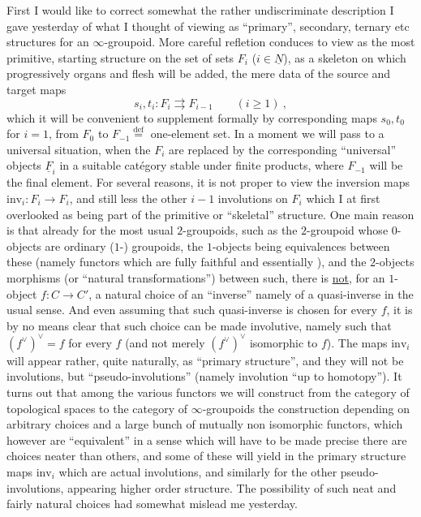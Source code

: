 \quad First I would like to correct somewhat the rather undiscriminate description I gave yesterday of what I thought of viewing as ``primary'', secondary, ternary etc structures for an $\infty$-groupoid. More careful refletion conduces to view as the most primitive, starting structure on the set of sets $F_i$ ($i\in\underline{N}$), as a skeleton on which progressively organs and flesh will be added, the mere data of the source and target maps
\[
s_i,t_i:F_i\rightrightarrows F_{i-1}\qquad(i\geq1)\ ,
\]
which it will be convenient to supplement  formally by corresponding maps $s_0,t_0$ for $i=1$, from $F_0$ to $F_{-1}\mathrel{\overset{\mathrm{def}}{=}}$ one-element set. In a moment we will pass to a universal situation, when the $F_i$ are replaced by the corresponding ``universal'' objects $\underline{F}_i$ in a suitable catégory stable under finite products, where $F_{-1}$ will be the final element. For several reasons, it is not proper to view the inversion maps $\mathrm{inv}_i:F_i\to F_i$, and still less the other $i-1$ involutions on $F_i$ which I at first overlooked\handwritten{,} as being part of the primitive or ``skeletal'' structure. One main reason is that already for the most usual $2$-groupoids, such as the $2$-groupoid whose $0$-objects are ordinary ($1$-) groupoids, the $1$-objects being equivalences between these (namely functors which are fully faithful and essentially ), and the $2$-objects morphisms (or ``natural transformations'') between such, there is \uline{not}, for an $1$-object $f:C\to C'$, a natural choice of an ``inverse'' namely of a quasi-inverse in the usual sense. And even assuming that such quasi-inverse is chosen for every $f$, it is by no means clear that such choice can be made involutive, namely such that $(f^{\vee})^{\vee}=f$ for every $f$ (and not merely $(f^{\vee})^{\vee}$ isomorphic to $f$). The maps $\mathrm{inv}_i$ will appear rather, quite naturally, as ``primary structure'', and they will not be involutions, but ``pseudo-involutions'' (namely involution ``up to homotopy''). It turns out that among the various functors \inserted{\handwritten{$\Pi_\infty$}} we will construct\handwritten{,} from the category of topological spaces to the category of $\infty$-groupoids\deleted{\unsure{,}} \handwritten{(}the construction depending on arbitrary choices and  a large bunch of mutually non isomorphic functors, which however are ``equivalent'' in a sense which will have to be made precise\unsure{\ldots}\deleted{-}\handwritten{)} there are choices neater than others, and some of these will yield in the primary structure maps $\mathrm{inv}_i$ which are actual involutions, and similarly for the other pseudo-involutions, appearing  higher order structure. The possibility of such neat and fairly natural choices had somewhat mislead me
yesterday.

